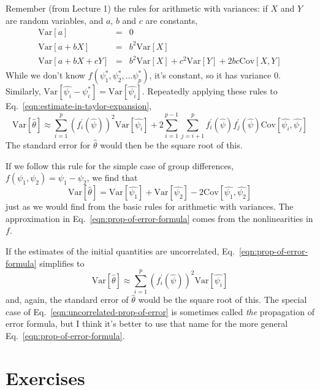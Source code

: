 \documentclass{article}
\newcommand{\Var}[1]{\mathrm{Var}\left[ #1 \right]}
\newcommand{\Cov}[1]{\mathrm{Cov}\left[ #1 \right]}
\begin{document}
Remember (from Lecture 1) the rules for arithmetic with variances: if $X$ and $Y$ are random variables, and $a$, $b$ and $c$ are constants,
\begin{eqnarray}
\Var{a} & = & 0\\
\Var{a+bX} & = & b^2\Var{X}\\
\Var{a+bX+cY} & = & b^2\Var{X} + c^2\Var{Y} + 2bc\Cov{X,Y}
\end{eqnarray}
While
we don't know $f(\psi_1^*,\psi_2^*,\ldots \psi_p^*)$, it's constant, so it has
variance 0. Similarly, $\Var{\widehat{\psi_i} - \psi_i^*} =
\Var{\widehat{\psi_i}}$.   Repeatedly applying these rules to Eq.\ \ref{eqn:estimate-in-taylor-expansion},
\begin{equation}
\Var{\widehat{\theta}}  \approx  \sum_{i=1}^{p}{(f^{\prime}_i(\widehat{\psi}))^2 \Var{\widehat{\psi_i}}} + 2\sum_{i=1}^{p-1}{\sum_{j=i+1}^{p}{f^{\prime}_i(\widehat{\psi}) f^{\prime}_{j}(\widehat{\psi}) \Cov{\widehat{\psi_i},\widehat{\psi_j}}}}
\label{eqn:prop-of-error-formula}
\end{equation}
The standard error for $\widehat{\theta}$ would then be the square root of this.

If we follow this rule for the simple case of group differences, $f(\psi_1,\psi_2) = \psi_1 - \psi_2$, we find that
\begin{equation}
\Var{\widehat{\theta}} = \Var{\widehat{\psi_1}} + \Var{\widehat{\psi_2}} - 2\Cov{\widehat{\psi_1},\widehat{\psi_2}}
\end{equation}
just as we would find from the basic rules for arithmetic with variances.  The
approximation in Eq.\ \ref{eqn:prop-of-error-formula} comes from the
nonlinearities in $f$.

If the estimates of the initial quantities are uncorrelated, Eq.\
\ref{eqn:prop-of-error-formula} simplifies to
\begin{equation}
\Var{\widehat{\theta}}  \approx  \sum_{i=1}^{p}{(f^{\prime}_i(\widehat{\psi}))^2 \Var{\widehat{\psi_i}}} \label{eqn:uncorrelated-prop-of-error}
\end{equation}
and, again, the standard error of $\widehat{\theta}$ would be the square root
of this.  The special case of Eq.\ \ref{eqn:uncorrelated-prop-of-error} is
sometimes called {\em the} propagation of error formula, but I think it's
better to use that name for the more general Eq.\
\ref{eqn:prop-of-error-formula}.



\section*{Exercises}
\end{document}
